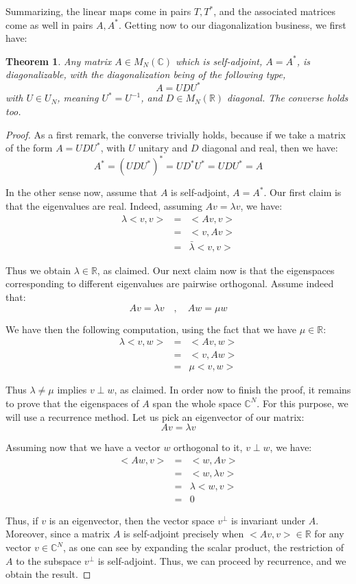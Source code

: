 \documentclass[12pt]{amsbook}
\newtheorem{theorem}{Theorem}[chapter]
\begin{document}
Summarizing, the linear maps come in pairs $T,T^*$, and the associated matrices come as well in pairs $A,A^*$. Getting now to our diagonalization business, we first have:


\begin{theorem}
Any matrix $A\in M_N(\mathbb C)$ which is self-adjoint, $A=A^*$, is diagonalizable, with the diagonalization being of the following type,
$$A=UDU^*$$
with $U\in U_N$, meaning $U^*=U^{-1}$, and $D\in M_N(\mathbb R)$ diagonal. The converse holds too.
\end{theorem}

\begin{proof}
As a first remark, the converse trivially holds, because if we take a matrix of the form $A=UDU^*$, with $U$ unitary and $D$ diagonal and real, then we have:
$$A^*
=(UDU^*)^*
=UD^*U^*
=UDU^*
=A$$

In the other sense now, assume that $A$ is self-adjoint, $A=A^*$.  Our first claim is that the eigenvalues are real. Indeed, assuming $Av=\lambda v$, we have:
\begin{eqnarray*}
\lambda<v,v>
&=&<Av,v>\\
&=&<v,Av>\\
&=&\bar{\lambda}<v,v>
\end{eqnarray*}

Thus we obtain $\lambda\in\mathbb R$, as claimed. Our next claim now is that the eigenspaces corresponding to different eigenvalues are pairwise orthogonal. Assume indeed that:
$$Av=\lambda v\quad,\quad 
Aw=\mu w$$

We have then the following computation, using the fact that we have $\mu\in\mathbb R$:
\begin{eqnarray*}
\lambda<v,w>
&=&<Av,w>\\
&=&<v,Aw>\\
&=&\mu<v,w>
\end{eqnarray*}

Thus $\lambda\neq\mu$ implies $v\perp w$, as claimed. In order now to finish the proof, it remains to prove that the eigenspaces of $A$ span the whole space $\mathbb C^N$. For this purpose, we will use a recurrence method. Let us pick an eigenvector of our matrix:
$$Av=\lambda v$$

Assuming now that we have a vector $w$ orthogonal to it, $v\perp w$, we have:
\begin{eqnarray*}
<Aw,v>
&=&<w,Av>\\
&=&<w,\lambda v>\\
&=&\lambda<w,v>\\
&=&0
\end{eqnarray*}

Thus, if $v$ is an eigenvector, then the vector space $v^\perp$ is invariant under $A$. Moreover, since a matrix $A$ is self-adjoint precisely when $<Av,v>\in\mathbb R$ for any vector $v\in\mathbb C^N$, as one can see by expanding the scalar product, the restriction of $A$ to the subspace $v^\perp$ is self-adjoint. Thus, we can proceed by recurrence, and we obtain the result.
\end{proof}
\end{document}
